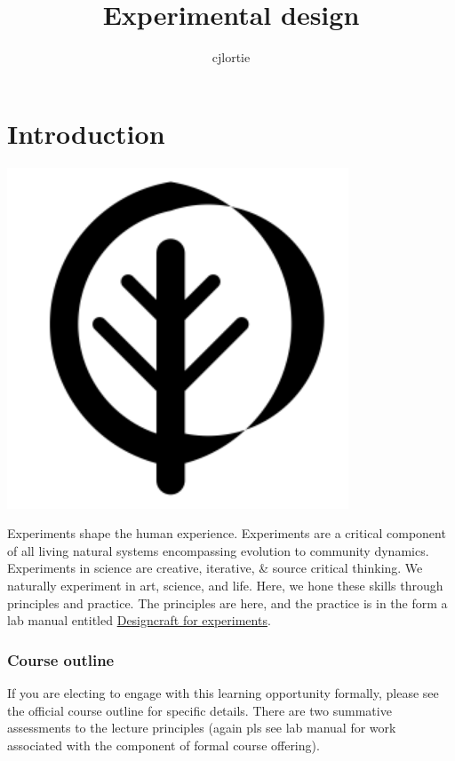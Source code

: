 \documentclass[
]{book}
\title{Experimental design}
\author{cjlortie}
\date{}
\begin{document}
\maketitle

{
\setcounter{tocdepth}{1}
\tableofcontents
}
\hypertarget{introduction}{%
\chapter*{Introduction}\label{introduction}}

\includegraphics[width=4in,height=\textheight]{./leaf.png}

Experiments shape the human experience. Experiments are a critical component of all living natural systems encompassing evolution to community dynamics. Experiments in science are creative, iterative, \& source critical thinking. We naturally experiment in art, science, and life. Here, we hone these skills through principles and practice. The principles are here, and the practice is in the form a lab manual entitled \href{https://bookdown.org/cj4nature/designcraft4experiments/}{Designcraft for experiments}.

\hypertarget{course-outline}{%
\subsection*{Course outline}\label{course-outline}}

If you are electing to engage with this learning opportunity formally, please see the official course outline for specific details. There are two summative assessments to the lecture principles (again pls see lab manual for work associated with the component of formal course offering).
\end{document}
